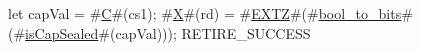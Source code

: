 let capVal = #\hyperref[sailRISCVzC]{C}#(cs1);
#\hyperref[sailRISCVzX]{X}#(rd) = #\hyperref[sailRISCVzEXTZ]{EXTZ}#(#\hyperref[sailRISCVzboolzytozybits]{bool\_to\_bits}#(#\hyperref[sailRISCVzisCapSealed]{isCapSealed}#(capVal)));
RETIRE_SUCCESS

